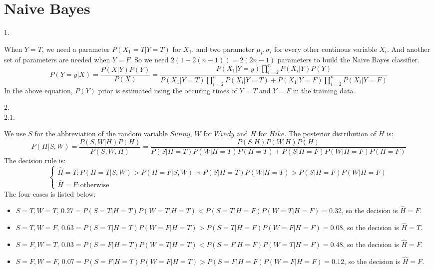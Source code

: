 \documentclass{article}
\theoremstyle{definition}
\theoremstyle{definition}
\theoremstyle{remark}
\begin{document}
\section*{Naive Bayes}

1.\\

\begin{addmargin}[3em]{2em}
  When $Y = T$, we need a parameter $P(X_1 = T | Y = T)$ for $X_1$, and two parameter $\mu_i, \sigma_i$ for every other continous variable $X_i$. And another set of parameters are needed when $Y = F$. So we need $2(1 + 2(n-1)) = 2(2n-1)$ parameters to build the Naive Bayes classifier.\\

  \[
  P(Y=y|X) = \frac{P(X|Y)P(Y)}{P(X)} = \frac{P(X_1|Y=y) \prod_{i=2}^n P(X_i|Y) P(Y)}{P(X_1|Y=T) \prod_{i=2}^n P(X_i|Y=T) + P(X_1|Y=F) \prod_{i=2}^n P(X_i|Y=F) }
  \]
  In the above equation, $P(Y)$ prior is estimated using the occuring times of $Y=T$ and $Y=F$ in the training data.
\end{addmargin}

2.\\
2.1.
\begin{addmargin}[3em]{2em}
  We use $S$ for the abbreviation of the random variable $Sunny$, $W$ for $Windy$ and $H$ for $Hike$. The posterior distribution of $H$ is:
  \[
  P(H | S, W) = \frac{P(S, W | H)P(H)}{P(S, W, H)} = \frac{P(S | H)P(W | H)P(H)}{P(S|H=T)P(W | H = T)P(H=T) + P(S|H=F)P(W | H = F)P(H=F)}
  \]
  The decision rule is:
  \[
  \begin{cases}
    \hat{H}=T: P(H=T|S,W) > P(H=F|S,W) \leadsto P(S|H=T)P(W|H=T) > P(S|H=F)P(W|H=F)\\
    \hat{H}=F: \mbox{otherwise}
  \end{cases}
  \]
  The four cases is listed below:
  \begin{itemize}
  \item $S=T, W=T$, $0.27 = P(S=T|H=T)P(W=T|H=T) < P(S=T|H=F)P(W=T|H=F) = 0.32$, so the decision is $\hat{H} = F$.
  \item $S=T, W=F$, $0.63 = P(S=T|H=T)P(W=F|H=T) > P(S=T|H=F)P(W=F|H=F) = 0.08$, so the decision is $\hat{H} = T$.
  \item $S=F, W=T$, $0.03 = P(S=F|H=T)P(W=T|H=T) < P(S=F|H=F)P(W=T|H=F) = 0.48$, so the decision is $\hat{H} = F$.
  \item $S=F, W=F$, $0.07 = P(S=F|H=T)P(W=F|H=T) > P(S=F|H=F)P(W=F|H=F) = 0.12$, so the decision is $\hat{H} = F$.
  \end{itemize}
\end{addmargin}
\end{document}
